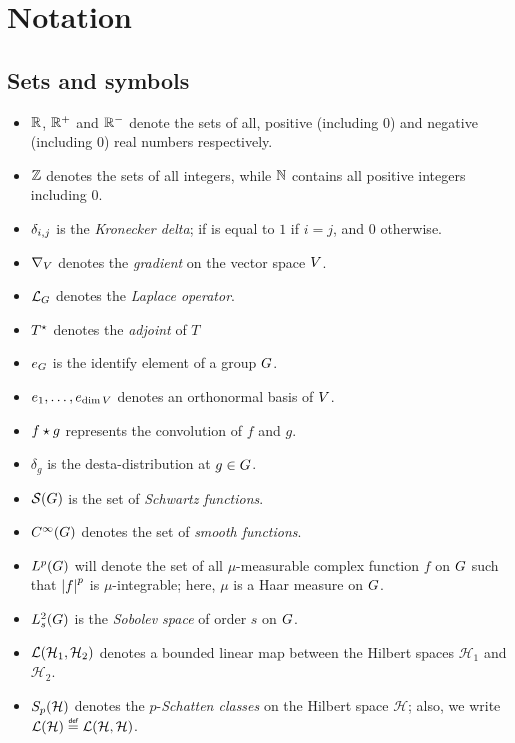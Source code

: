 \chapter*{Notation}

\section*{Sets and symbols}

\begin{itemize}
    \item $\mathbb{R}$, $\mathbb{R}^+$ and $\mathbb{R}^-$ denote the sets of all, positive (including $0$) and negative (including $0$) real numbers respectively.
    \item $\mathbb{Z}$ denotes the sets of all integers,
        while $\mathbb{N}$ contains all positive integers including $0$.
    \item $\delta_{i,j}$ is the \emph{Kronecker delta};
        if is equal to $1$ if $i = j$,
        and $0$ otherwise.
    \item $\nabla_{V}$ denotes the \emph{gradient} on the vector space $V$.
    \item ${\mathcal{L}_{G}}$ denotes the \emph{Laplace operator}.
    \item ${T}^\star$ denotes the \emph{adjoint} of $T$
    \item $e_G$ is the identify element of a group $G$.
    \item $e_1, \dots, e_{\dim V}$ denotes an orthonormal basis of $V$.
    \item $f \star g$ represents the convolution of $f$ and $g$.
    \item $\delta_g$ is the desta-distribution at $g \in G$.
    \item ${\mathcal{S} (G)}$ is the set of \emph{Schwartz functions}.
    \item ${C^\infty(G)}$ denotes the set of \emph{smooth functions}.
    \item ${L^{p} (G)}$ will denote the set of all $\mu$-measurable complex function $f$ on $G$ such that $\left|{f}\right|^p$ is $\mu$-integrable;
        here, $\mu$ is a Haar measure on $G$.
    \item $L^2_{s}(G)$ is the \emph{Sobolev space} of order $s$ on $G$.
    \item ${\mathcal{L} (\mathcal H_1, \mathcal H_2)}$ denotes a bounded linear map between the Hilbert spaces $\mathcal H_1$ and $\mathcal H_2$.
    \item $S_{p}(\mathcal H)$ denotes the $p$-\emph{Schatten classes} on the Hilbert space $\mathcal H$; also, we write $\Lin {\mathcal H} \defeq \Lin {\mathcal H, \mathcal H}$.

\end{itemize}
